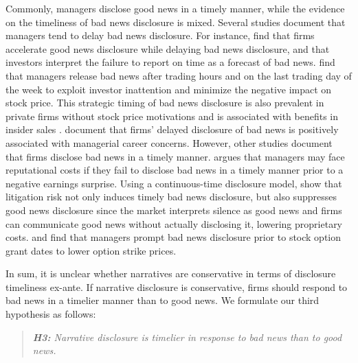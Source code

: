 \documentclass[letterpaper,12pt]{article}
\begin{document}
\begin{spacing}{1.5}
Commonly, managers disclose good news in a timely manner, while the evidence on the timeliness of bad news disclosure is mixed. Several studies document that managers tend to delay bad news disclosure. For instance,  find that firms accelerate good news disclosure while delaying bad news disclosure, and that investors interpret the failure to report on time as a forecast of bad news.  find that managers release bad news after trading hours and on the last trading day of the week to exploit investor inattention and minimize the negative impact on stock price. This strategic timing of bad news disclosure is also prevalent in private firms without stock price motivations \cite{brockbankStrategicTiming8K2018} and is associated with benefits in insider sales \cite{niessnerStrategicDisclosureTiming2015}.  document that firms' delayed disclosure of bad news is positively associated with managerial career concerns. However, other studies document that firms disclose bad news in a timely manner.  argues that managers may face reputational costs if they fail to disclose bad news in a timely manner prior to a negative earnings surprise. Using a continuous-time disclosure model,  show that litigation risk not only induces timely bad news disclosure, but also suppresses good news disclosure since the market interprets silence as good news and firms can communicate good news without actually disclosing it, lowering proprietary costs.  and  find that managers prompt bad news disclosure prior to stock option grant dates to lower option strike prices. 

In sum, it is unclear whether narratives are conservative in terms of disclosure timeliness ex-ante. If narrative disclosure is conservative, firms should respond to bad news in a timelier manner than to good news. We formulate our third hypothesis as follows:

\begin{quote}\label{hyp:h3}
\textit{\textbf{H3:} Narrative disclosure is timelier in response to bad news than to good news.}
\end{quote}

\begin{comment}

\end{comment}
\end{spacing}
\end{document}
